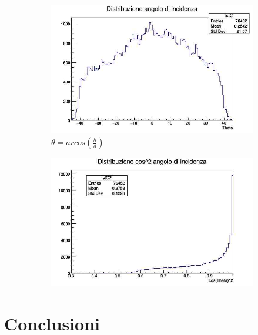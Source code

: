 \documentclass[a4paper]{article}
\begin{document}
\begin{figure}[H]
\begin{subfigure}[b]{0.4\textwidth}
\includegraphics[width=\textwidth]{./immagini/TimeOfFlight/DistrTheta.jpg}
\caption{$\theta = arcos(\frac{h}{d})$}
\label{fig:DistrTheta}
\end{subfigure}
\hfill
\begin{subfigure}[b]{0.4\textwidth}
\includegraphics[width=\textwidth]{./immagini/TimeOfFlight/DistrCos2.jpg}
\caption{}
\label{fig:DistrCos2}
\end{subfigure}
\end{figure}

\newpage
\section{Conclusioni}
\end{document}

